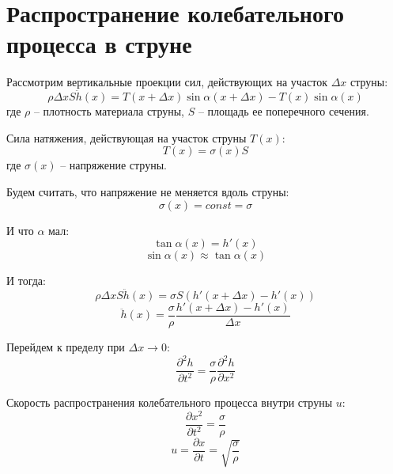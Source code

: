 \documentclass{article}
\begin{document}
    \section{Распространение колебательного процесса в струне}

    Рассмотрим вертикальные проекции сил, действующих на участок $\Delta x$ струны:
    \begin{equation}
        \rho \Delta x S \ddot h(x) = T(x + \Delta x) \sin \alpha (x + \Delta x) - T (x) \sin \alpha (x)
    \end{equation}
    где $\rho$ -- плотность материала струны, $S$ -- площадь ее поперечного сечения.
    
    Сила натяжения, действующая на участок струны $T(x)$:
    \begin{equation}
        T (x) = \sigma (x) S
    \end{equation}
    где $\sigma(x)$ -- напряжение струны.

    Будем считать, что напряжение не меняется вдоль струны:
    \begin{equation}
        \sigma (x) = const = \sigma
    \end{equation}
    
    И что $\alpha$ мал:
    \begin{equation}
        \tan \alpha (x) = h'(x)
    \end{equation}
    \begin{equation}
        \sin \alpha (x) \approx \tan \alpha (x)
    \end{equation}

    И тогда:
    \begin{equation}
        \rho \Delta x S \ddot h(x) = \sigma S (h'(x + \Delta x) - h'(x))
    \end{equation}
    \begin{equation}
        \ddot h(x) = \frac {\sigma} {\rho} \frac {h'(x + \Delta x) - h'(x)} {\Delta x}
    \end{equation}

    Перейдем к пределу при $\Delta x \longrightarrow 0$:
    \begin{equation}
        \frac{\partial^2 h}{\partial t^2} = \frac {\sigma} {\rho} \frac{\partial^2 h}{\partial x^2}
    \end{equation}

    Скорость распространения колебательного процесса внутри струны $u$:
    \begin{equation}
        \frac{\partial x^2}{\partial t^2} = \frac {\sigma} {\rho}
    \end{equation}
    \begin{equation}
        u = \frac{\partial x}{\partial t} = \sqrt {\frac {\sigma} {\rho}}
    \end{equation}
\end{document}
